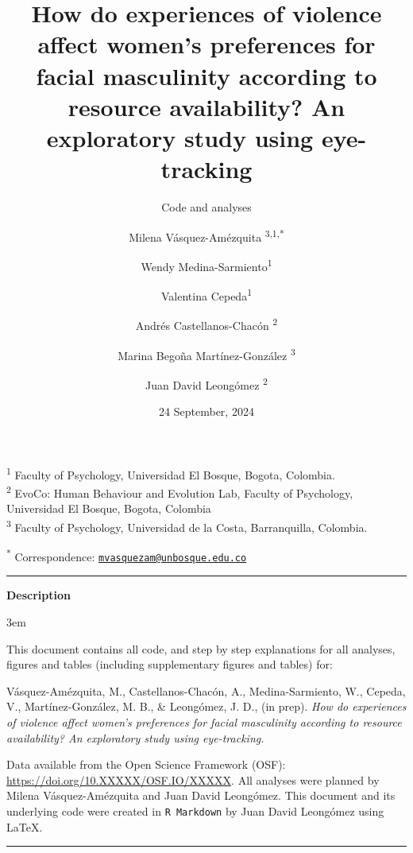 \documentclass[
  bookmarksnumbered]{article}
\title{How do experiences of violence affect women's preferences for facial masculinity according to resource availability? An exploratory study using eye-tracking}
\subtitle{Code and analyses}
\author{Milena Vásquez-Amézquita \orcidlink{0000-0001-7317-8430}\textsuperscript{3,1,*} \and Wendy Medina-Sarmiento\textsuperscript{1} \and Valentina Cepeda\textsuperscript{1} \and Andrés Castellanos-Chacón \orcidlink{0000-0003-1684-9319}\textsuperscript{2} \and Marina Begoña Martínez-González \orcidlink{0000-0002-5840-6383}\textsuperscript{3} \and Juan David Leongómez \orcidlink{0000-0002-0092-6298}\textsuperscript{2}}
\date{24 September, 2024}
\begin{document}
\maketitle

\textsuperscript{1} Faculty of Psychology, Universidad El Bosque, Bogota, Colombia.\\
\textsuperscript{2} EvoCo: Human Behaviour and Evolution Lab, Faculty of Psychology, Universidad El Bosque, Bogota, Colombia\\
\textsuperscript{3} Faculty of Psychology, Universidad de la Costa, Barranquilla, Colombia.

\textsuperscript{*} Correspondence: \href{mailto:mvasquezam@unbosque.edu.co}{\href{mailto:mvasquezam@unbosque.edu.co}{\nolinkurl{mvasquezam@unbosque.edu.co}}}

\begin{center}\rule{0.5\linewidth}{0.5pt}\end{center}

\begin{center}
\textbf{Description}
\end{center}

\par
\begingroup
\leftskip3em
\rightskip\leftskip

This document contains all code, and step by step explanations for all analyses, figures and tables (including supplementary figures and tables) for:

\begin{hangparas}{.25in}{1}
Vásquez-Amézquita, M., Castellanos-Chacón, A., Medina-Sarmiento, W., Cepeda, V., Martínez-González, M. B., \& Leongómez, J. D.,  (in prep). \textit{How do experiences of violence affect women's preferences for facial masculinity according to resource availability? An exploratory study using eye-tracking.}
\end{hangparas}

Data available from the Open Science Framework (OSF): \url{https://doi.org/10.XXXXX/OSF.IO/XXXXX}. All analyses were planned by Milena Vásquez-Amézquita and Juan David Leongómez. This document and its underlying code were created in \texttt{R\ Markdown} by Juan David Leongómez using \LaTeX.

\begin{center}\rule{0.5\linewidth}{0.5pt}\end{center}

\par
\endgroup

{\hypersetup{hidelinks}
\setcounter{tocdepth}{6}
\tableofcontents
}
\opensupplement
\end{document}
